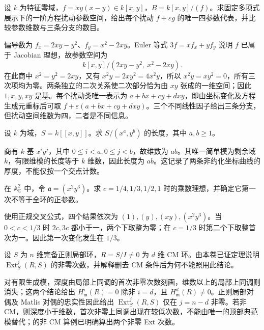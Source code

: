 \begin{exercise}\label{b3:ex:C-node-deformation}
	设 \(k\) 为特征零域，\(f=xy(x-y)\in k[x,y]\)，\(B=k[x,y]/(f)\)。求固定多项式展示下的一阶方程扰动参数空间，给出每个扰动 \(f+\varepsilon g\) 的唯一四参数代表，并比较参数维数与三条分支的数目。
\end{exercise}
\begin{solution}
	偏导数为 \(f_x=2xy-y^2\)、\(f_y=x^2-2xy\)。Euler 等式 \(3f=xf_x+yf_y\) 说明 \(f\) 已属于 Jacobian 理想，故参数空间为
	\[
		k[x,y]/(2xy-y^2,\ x^2-2xy).
	\]
	在此商中 \(x^2=y^2=2xy\)，又有 \(x^2y=2xy^2=4x^2y\)，所以 \(x^2y=xy^2=0\)，所有三次项均为零。两条独立的二次关系使二次部分恰为由 \(xy\) 张成的一维空间；因此 \(1,x,y,xy\) 是基。每个扰动类唯一表示为 \(a+bx+cy+dxy\)，即由坐标变化及方程生成元重标后可取 \(f+\varepsilon(a+bx+cy+dxy)\)。三个不同线性因子给出三条分支，但扰动空间维数为四，二者是不同信息。
\end{solution}

\begin{exercise}\label{b3:ex:C-intersection-two-thicknesses}
	设 \(k\) 为域，\(S=k[\![x,y]\!]\)。求 \(S/(x^a,y^b)\) 的长度，其中 \(a,b\ge1\)。
\end{exercise}
\begin{solution}
	商有 \(k\) 基 \(x^iy^j\)，其中 \(0\le i<a,0\le j<b\)，故维数为 \(ab\)。其唯一简单模为剩余域 \(k\)，有限维模的长度等于 \(k\) 维数，因此长度为 \(ab\)。这记录了两条非约化坐标曲线的厚度，不能仅按一个交点计数。
\end{solution}

\begin{exercise}\label{b3:ex:C-multiplier-jumps}
	在 \(\mathbb A^2_{\mathbb C}\) 中，令 \(\mathfrak a=(x^2y^3)\)。求 \(c=1/4,1/3,1/2,1\) 时的乘数理想，并确定它第一次不等于全环的正参数。
\end{exercise}
\begin{solution}
	使用正规交叉公式，四个结果依次为 \((1),(y),(xy),(x^2y^3)\)。当 \(0<c<1/3\) 时 \(2c,3c\) 都小于一，两个下取整为零；在 \(c=1/3\) 时第二个下取整首次为一。因此第一次变化发生在 \(1/3\)。
\end{solution}

\begin{exercise}\label{b3:ex:C-cm-and-dual-degrees}
	设 \(S\) 为 \(n\) 维完备正则局部环，\(R=S/I\ne0\) 为 \(d\) 维 CM 环。由本卷已证定理说明 \(\operatorname{Ext}_S^j(R,S)\) 的非零次数，并解释删去 CM 条件后为何不能照用此结论。
\end{exercise}
\begin{solution}
	对有限生成模，深度由局部上同调的首次非零次数刻画，维数以上的局部上同调则消失；这两个结论给出 \(H_{\mathfrak m}^i(R)=0\) 除非 \(i=d\)，且 \(H_{\mathfrak m}^d(R)\ne0\)。正则局部对偶及 Matlis 对偶的忠实性因此给出 \(\operatorname{Ext}_S^j(R,S)\) 仅在 \(j=n-d\) 非零。若非 CM，则深度小于维数，首次非零上同调出现在较低次数，不能由唯一的顶部典范模替代；的非 CM 算例已明确算出两个非零 Ext 次数。
\end{solution}


